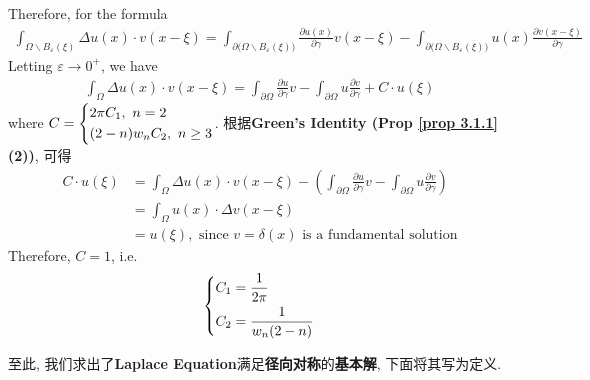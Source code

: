 	\hspace*{-1.95em}Therefore, for the formula 
	\begin{align*}
		\int_{\Omega \backslash B_{\varepsilon}(\xi)} \Delta u(x) \cdot v(x - \xi) 
		= \int_{\partial \Big( \Omega \backslash B_{\varepsilon}(\xi) \Big)} \frac{\partial u(x)}{\partial \gamma} v(x - \xi) 
		- \int_{\partial \Big( \Omega \backslash B_{\varepsilon}(\xi) \Big)} u(x) \frac{\partial v(x - \xi)}{\partial \gamma}
	\end{align*}
	Letting $\varepsilon \to 0^+$, we have 
	\begin{align}
		\int_{\Omega} \Delta u(x) \cdot v(x - \xi) 
		= \int_{\partial \Omega} \frac{\partial u}{\partial \gamma} v
		- \int_{\partial \Omega} u \frac{\partial v}{\partial \gamma} + C \cdot u(\xi) \label{3.1}
	\end{align}
	where $C = 
	\begin{dcases*}
		2 \pi C_1 , \,\, n = 2 \\
		(2 - n) w_n C_2 , \,\, n \geq 3
	\end{dcases*}$. 根据\textbf{Green's Identity (Prop \ref{prop 3.1.1} (2))}, 可得
	\begin{align*}
		C \cdot u(\xi) 
		&= \int_{\Omega} \Delta u(x) \cdot v(x - \xi) - \left( \int_{\partial \Omega} \frac{\partial u}{\partial \gamma} v
		- \int_{\partial \Omega} u \frac{\partial v}{\partial \gamma} \right) \\
		&= \int_{\Omega} u(x) \cdot \Delta v(x - \xi) \\
		&= u(\xi) , \,\, \text{since $v = \delta(x)$ is a fundamental solution}
	\end{align*}
	Therefore, $C = 1$, i.e.
	\begin{align*}
		\begin{dcases*}
			C_1 = \frac{1}{2\pi} \\
			C_2 = \frac{1}{w_n (2 - n)}
		\end{dcases*}
	\end{align*}

	\newpage
	
	至此, 我们求出了\textbf{Laplace Equation}满足\textbf{径向对称}的\textbf{基本解}, 下面将其写为定义. 
	
